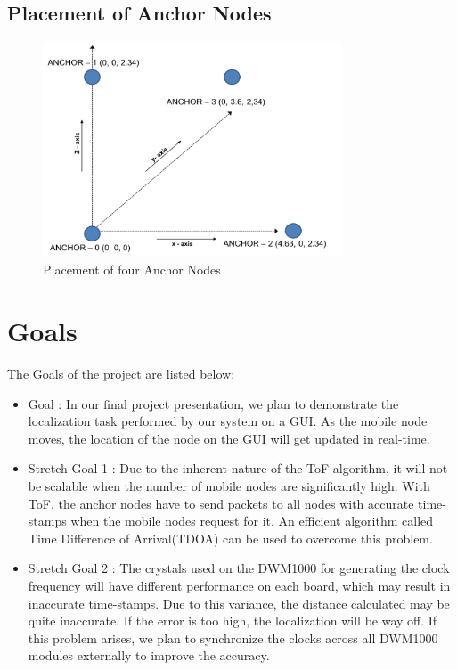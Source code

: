 \documentclass[journal,transmag]{IEEEtran}
\begin{document}
\subsection{Placement of Anchor Nodes}
\begin{figure}[!h]
\centering
\includegraphics[width=3.5in]{anchorplacements.png}
\caption{{Placement of four Anchor Nodes}}
\label{anchorplacement}
\end{figure}


\section{Goals}
The Goals of the project are listed below: 

\begin{itemize}
    \item Goal : In our final project presentation, we plan to demonstrate the localization task performed by our system on a GUI. As the mobile node moves, the location of the node on the GUI will get updated in real-time.
    \item Stretch Goal 1 : Due to the inherent nature of the ToF algorithm, it will not be scalable when the number of mobile nodes are significantly high. With ToF, the anchor nodes have to send packets to all nodes with accurate time-stamps when the mobile nodes request for it. An efficient algorithm called Time Difference of Arrival(TDOA) can be used to overcome this problem. 
    \item Stretch Goal 2 : The crystals used on the DWM1000 for generating the clock frequency will have different performance on each board, which may result in inaccurate time-stamps. Due to this variance, the distance calculated may be quite inaccurate. If the error is too high, the localization will be way off. If this problem arises, we plan to synchronize the clocks across all DWM1000 modules externally to improve the accuracy.    
\end{itemize}
\end{document}
